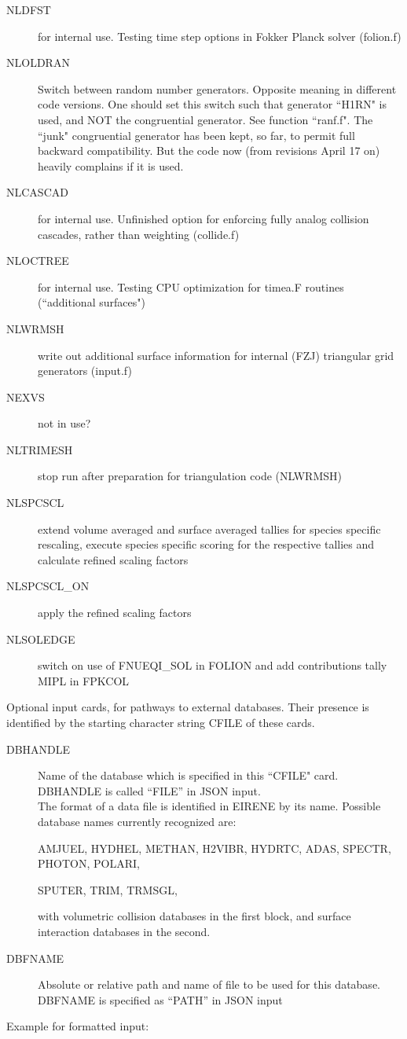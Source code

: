 \begin{description}
  \item[NLDFST] for internal use.
        Testing time step options in Fokker Planck solver (folion.f)
  \item[NLOLDRAN]
        Switch between random number generators.
        Opposite meaning in different code versions.
        One should set this switch such that generator ``H1RN" is used, and NOT the
        congruential generator.
        See function ``ranf.f".
        The ``junk" congruential generator has been kept, so far, to permit full
        backward compatibility.
        But the code now (from revisions April 17 on) heavily complains if it is used.
  \item[NLCASCAD] for internal use.
        Unfinished option for enforcing fully analog collision cascades, rather than
        weighting  (collide.f)
  \item[NLOCTREE] for internal use.
        Testing CPU optimization for timea.F routines (``additional surfaces")
  \item[NLWRMSH] write out additional surface information for internal (FZJ)
        triangular grid generators (input.f)
  \item[NEXVS] not in use?
  \item[NLTRIMESH] stop run after preparation for triangulation code (NLWRMSH)
  \item[NLSPCSCL] extend volume averaged and surface averaged tallies for species
        specific rescaling, execute species specific scoring for the respective tallies
        and calculate refined scaling factors 
  \item[NLSPCSCL\_ON] apply the refined scaling factors
  \item[NLSOLEDGE] switch on use of FNUEQI\_SOL in FOLION and add contributions tally MIPL in FPKCOL
\end{description}
Optional input cards,
for pathways to external databases.
Their presence is identified by the starting character string CFILE of these
cards.
\begin{description}
  \item[DBHANDLE] Name of the database which is specified in this ``CFILE" card.\\
  	  DBHANDLE is called ``FILE'' in JSON input. \\
        The format of a data file is identified in EIRENE by its name.
        Possible database names currently recognized are:

        AMJUEL, HYDHEL, METHAN, H2VIBR, HYDRTC, ADAS,  SPECTR, PHOTON, POLARI,

        \medskip 

        SPUTER, TRIM,  TRMSGL, 

        with volumetric collision databases in the first block, and surface interaction
        databases in the second.
  \item[DBFNAME] Absolute or relative path and name of file to be used for this
        database. \\
        DBFNAME is specified as ``PATH'' in JSON input
\end{description}
Example for formatted input:

